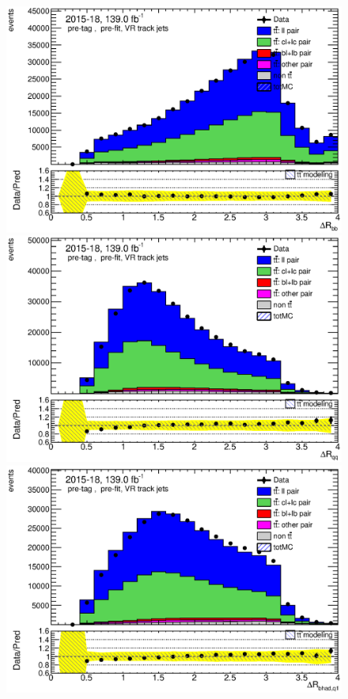 \documentclass[letterpaper,12pt]{article}
\begin{document}
	
	\begin{figure}
	\begin{minipage}[b]{.45\textwidth}
	\centering
	\includegraphics[width=1\textwidth]{Oct_distributions/pretagNoRwDL1rwithhighpTVRJets_scaledall/DataMC_dRbb.eps}
	\end{minipage}\hfill
	\begin{minipage}[b]{.45\textwidth}
	\centering
	\includegraphics[width=1\textwidth]{Oct_distributions/pretagNoRwDL1rwithhighpTVRJets_scaledall/DataMC_dRqq.eps}
	\end{minipage}\hfill
	\begin{minipage}[b]{.45\textwidth}
	\centering
	\includegraphics[width=1\textwidth]{Oct_distributions/pretagNoRwDL1rwithhighpTVRJets_scaledall/DataMC_dRbhadq1.eps}

\end{minipage}
\end{figure}
\end{document}
